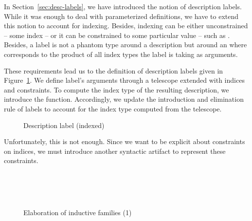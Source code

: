 \documentclass{scrartcl}
\theoremstyle{plain}
\theoremstyle{definition}
\begin{document}
In Section~\ref{sec:desc-labels}, we have introduced the notion of
description labels. While it was enough to deal with
parameterized definitions, we have to extend this notion to
account for indexing. Besides, indexing can be either unconstrained --
some index  -- or it can be constrained to some
particular value -- such as . Besides, a label is
not a phantom type around a description but around an 
where  corresponds to the product of all index types the label is
taking as arguments. 



These requirements lead us to the definition of description labels
given in Figure~\ref{fig:idesc-label}. We define label's arguments
through a telescope extended with indices and constraints. To compute
the index type of the resulting description, we introduce the
 function. Accordingly, we update the introduction
and elimination rule of labels to account for the index type computed
from the telescope.

\begin{figure}


\caption{Description label (indexed)}
\label{fig:idesc-label}

\end{figure}





\newcommand{\IDataPattern}{\mathrm{patt}}
\newcommand{\TypeIDataPattern}[2]{\Judgment{#1}{#2 \:\IDataPattern}}


Unfortunately, this is not enough. Since we want to be explicit about
constraints on indices, we must introduce another syntactic artifact
to represent these constraints. 




\fi



\renewcommand{\ElabChoices}[5]
           {#1 \vdash #3 \ni #2 
                 \ElabRel{Cs}
                     [#4 \mapsto #5]}


\begin{figure}[tbp]

\centering



\\
\\
\\

\caption{Elaboration of inductive families (1)}
\label{fig:elab-families-1}

\end{figure}
\end{document}
